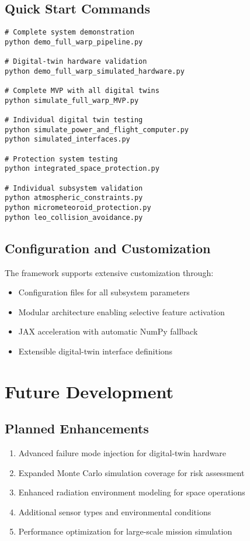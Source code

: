 \documentclass[11pt]{article}
\begin{document}
\subsection{Quick Start Commands}
\begin{verbatim}
# Complete system demonstration
python demo_full_warp_pipeline.py

# Digital-twin hardware validation
python demo_full_warp_simulated_hardware.py

# Complete MVP with all digital twins
python simulate_full_warp_MVP.py

# Individual digital twin testing
python simulate_power_and_flight_computer.py
python simulated_interfaces.py

# Protection system testing
python integrated_space_protection.py

# Individual subsystem validation
python atmospheric_constraints.py
python micrometeoroid_protection.py
python leo_collision_avoidance.py
\end{verbatim}

\subsection{Configuration and Customization}
The framework supports extensive customization through:
\begin{itemize}
\item Configuration files for all subsystem parameters
\item Modular architecture enabling selective feature activation
\item JAX acceleration with automatic NumPy fallback
\item Extensible digital-twin interface definitions
\end{itemize}

\section{Future Development}

\subsection{Planned Enhancements}
\begin{enumerate}
\item Advanced failure mode injection for digital-twin hardware
\item Expanded Monte Carlo simulation coverage for risk assessment
\item Enhanced radiation environment modeling for space operations
\item Additional sensor types and environmental conditions
\item Performance optimization for large-scale mission simulation
\end{enumerate}
\end{document}
